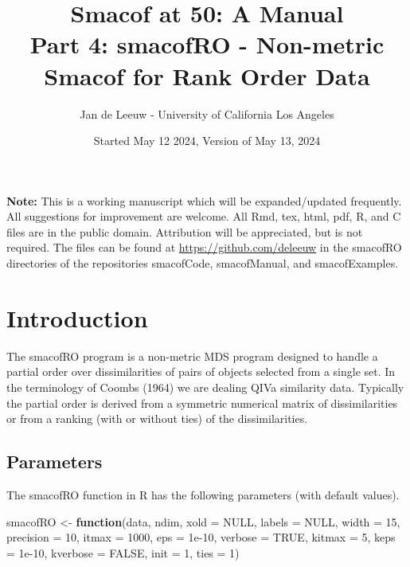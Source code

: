 \documentclass[
  12pt,
]{article}
\title{Smacof at 50: A Manual\\
Part 4: smacofRO - Non-metric Smacof for Rank Order Data}
\author{Jan de Leeuw - University of California Los Angeles}
\date{Started May 12 2024, Version of May 13, 2024}
\newenvironment{Shaded}{\begin{snugshade}}{\end{snugshade}}
\newcommand{\AttributeTok}[1]{\textcolor[rgb]{0.13,0.29,0.53}{#1}}
\newcommand{\ConstantTok}[1]{\textcolor[rgb]{0.56,0.35,0.01}{#1}}
\newcommand{\ControlFlowTok}[1]{\textcolor[rgb]{0.13,0.29,0.53}{\textbf{#1}}}
\newcommand{\DecValTok}[1]{\textcolor[rgb]{0.00,0.00,0.81}{#1}}
\newcommand{\FloatTok}[1]{\textcolor[rgb]{0.00,0.00,0.81}{#1}}
\newcommand{\NormalTok}[1]{#1}
\newcommand{\OtherTok}[1]{\textcolor[rgb]{0.56,0.35,0.01}{#1}}
\begin{document}
\maketitle

{
\setcounter{tocdepth}{3}
\tableofcontents
}
\textbf{Note:} This is a working manuscript which will be expanded/updated
frequently. All suggestions for improvement are welcome. All Rmd, tex,
html, pdf, R, and C files are in the public domain. Attribution will be
appreciated, but is not required. The files can be found at
\url{https://github.com/deleeuw} in the smacofRO directories of the
repositories smacofCode, smacofManual, and smacofExamples.

\section{Introduction}\label{introduction}

The smacofRO program is a non-metric MDS program designed
to handle a partial order over dissimilarities of pairs of objects selected
from a single set. In the terminology of Coombs (1964) we are dealing
QIVa similarity data. Typically the partial order is derived from a
symmetric numerical matrix of dissimilarities or from a ranking
(with or without ties) of the dissimilarities.

\subsection{Parameters}\label{parameters}

The smacofRO function in R has the following parameters (with default values).

\begin{Shaded}
\begin{Highlighting}[]
\NormalTok{smacofRO }\OtherTok{\textless{}{-}} \ControlFlowTok{function}\NormalTok{(data,}
\NormalTok{                     ndim,}
                     \AttributeTok{xold =} \ConstantTok{NULL}\NormalTok{,}
                     \AttributeTok{labels =} \ConstantTok{NULL}\NormalTok{,}
                     \AttributeTok{width =} \DecValTok{15}\NormalTok{,}
                     \AttributeTok{precision =} \DecValTok{10}\NormalTok{,}
                     \AttributeTok{itmax =} \DecValTok{1000}\NormalTok{,}
                     \AttributeTok{eps =} \FloatTok{1e{-}10}\NormalTok{,}
                     \AttributeTok{verbose =} \ConstantTok{TRUE}\NormalTok{,}
                     \AttributeTok{kitmax =} \DecValTok{5}\NormalTok{,}
                     \AttributeTok{keps =} \FloatTok{1e{-}10}\NormalTok{,}
                     \AttributeTok{kverbose =} \ConstantTok{FALSE}\NormalTok{,}
                     \AttributeTok{init =} \DecValTok{1}\NormalTok{,}
                     \AttributeTok{ties =} \DecValTok{1}\NormalTok{)}
\end{Highlighting}
\end{Shaded}
\end{document}
